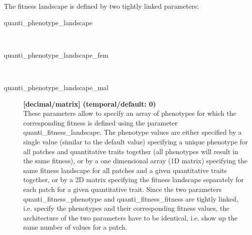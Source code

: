 \documentclass[letterpaper,12pt,oneside]{book}
\begin{document}
The fitness landscape is defined by two tightly linked parameters:

\begin{description}
\item[quanti\_phenotype\_landscape]\hspace*{\fill}\\
\vspace{-9mm}
\item[quanti\_phenotype\_landscape\_fem]\hspace*{\fill}\\
\vspace{-9mm}
\item[quanti\_phenotype\_landscape\_mal]\textbf{[decimal/matrix] (temporal/default: 0)}\\
These parameters allow to specify an array of phenotypes for which the corresponding fitness is defined using the parameter \textsf{quanti\_fitness\_landscape}.  The phenotype values are either specified by a single value (similar to the default value) specifying a unique phenotype for all patches and quantitative traits together (all phenotypes will result in the same fitness), or by a one dimensional array (1D matrix) specifying the same fitness landscape for all patches and a given quantitative traits together, or by a 2D matrix specifying the fitness landscape separately for each patch for a given quantitative trait. Since the two parameters \textsf{quanti\_fitness\_phenotype} and \textsf{quanti\_fitness\_fitness} are tightly linked, i.e. specify the phenotypes and their corresponding fitness values, the architecture of the two parameters have to be identical, i.e. show up the same number of values for a patch. 



\end{description}
\end{document}
